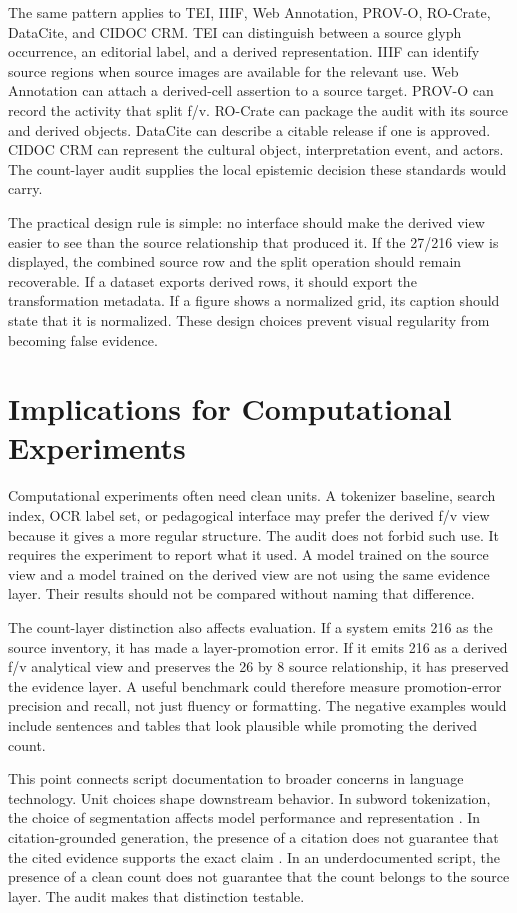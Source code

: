 \documentclass[sigconf,nonacm]{acmart}
\begin{document}
The same pattern applies to TEI, IIIF, Web Annotation, PROV-O, RO-Crate,
DataCite, and CIDOC CRM. TEI can distinguish between a source glyph occurrence,
an editorial label, and a derived representation. IIIF can identify source
regions when source images are available for the relevant use. Web Annotation
can attach a derived-cell assertion to a source target. PROV-O can record the
activity that split f/v. RO-Crate can package the audit with its source and
derived objects. DataCite can describe a citable release if one is approved.
CIDOC CRM can represent the cultural object, interpretation event, and actors.
The count-layer audit supplies the local epistemic decision these standards
would carry.

The practical design rule is simple: no interface should make the derived view
easier to see than the source relationship that produced it. If the 27/216 view
is displayed, the combined source row and the split operation should remain
recoverable. If a dataset exports derived rows, it should export the
transformation metadata. If a figure shows a normalized grid, its caption should
state that it is normalized. These design choices prevent visual regularity
from becoming false evidence.

\section{Implications for Computational Experiments}
Computational experiments often need clean units. A tokenizer baseline, search
index, OCR label set, or pedagogical interface may prefer the derived f/v view
because it gives a more regular structure. The audit does not forbid such use.
It requires the experiment to report what it used. A model trained on the source
view and a model trained on the derived view are not using the same evidence
layer. Their results should not be compared without naming that difference.

The count-layer distinction also affects evaluation. If a system emits 216 as
the source inventory, it has made a layer-promotion error. If it emits 216 as a
derived f/v analytical view and preserves the 26 by 8 source relationship, it
has preserved the evidence layer. A useful benchmark could therefore measure
promotion-error precision and recall, not just fluency or formatting. The
negative examples would include sentences and tables that look plausible while
promoting the derived count.

This point connects script documentation to broader concerns in language
technology. Unit choices shape downstream behavior. In subword tokenization,
the choice of segmentation affects model performance and representation
\cite{sennrich2016bpe,kudo2018sentencepiece,bostrom2020bytepair,rust2021tokenization}.
In citation-grounded generation, the presence of a citation does not guarantee
that the cited evidence supports the exact claim
\cite{wadden2020scifact,gao2023alce}. In an underdocumented script, the
presence of a clean count does not guarantee that the count belongs to the
source layer. The audit makes that distinction testable.
\end{document}

